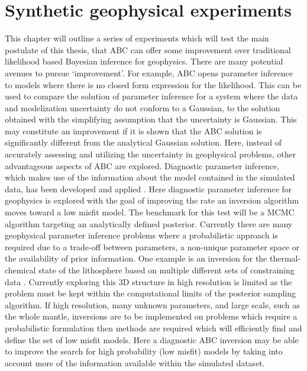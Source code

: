 \chapter{Synthetic geophysical experiments}
\label{SGE}
This chapter will outline a series of experiments which will test the main postulate of this thesis, that ABC can offer some improvement over traditional likelihood based Bayesian inference for geophysics. There are many potential avenues to pursue `improvement'. For example, ABC opens parameter inference to models where there is no closed form expression for the likelihood. This can be used to compare the solution of parameter inference for a system where the data and modelization uncertainty do not conform to a Gaussian, to the solution obtained with the simplifying assumption that the uncertainty is Gaussian. This may constitute an improvement if it is shown that the ABC solution is significantly different from the analytical Gaussian solution. Here, instead of accurately assessing and utilizing the uncertainty in geophysical problems, other advantageous aspects of ABC are explored. Diagnostic parameter inference, which makes use of the information about the model contained in the simulated data, has been developed and applied \citep{Ratmann2009,vrugt2013toward}. Here diagnostic parameter inference for geophysics is explored with the goal of improving the rate an inversion algorithm moves toward a low misfit model. The benchmark for this test will be a MCMC algorithm targeting an analytically defined posterior. Currently there are many geophysical parameter inference problems where a probabilistic approach is required due to a trade-off between parameters, a non-unique parameter space or the availability of prior information. One example is an inversion for the thermal-chemical state of the lithosphere based on multiple different sets of constraining data \citep{afonso2013a,afonso2013b}. Currently exploring this 3D structure in high resolution is limited as the problem must be kept within the computational limits of the posterior sampling algorithm. If high resolution, many unknown parameters, and large scale, such as the whole mantle, inversions are to be implemented on problems which require a probabilistic formulation then methods are required which will efficiently find and define the set of low misfit models. Here a diagnostic ABC inversion may be able to improve the search for high probability (low misfit) models by taking into account more of the information available within the simulated dataset. \par

